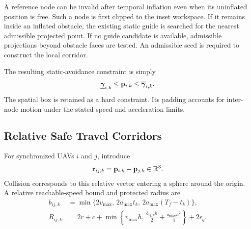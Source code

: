 A reference node can be invalid after temporal inflation even when its uninflated position is free. Such a node is first clipped to the inset workspace. If it remains inside an inflated obstacle, the existing static guide is searched for the nearest admissible projected point. If no guide candidate is available, admissible projections beyond obstacle faces are tested. An admissible seed is required to construct the local corridor.

The resulting static-avoidance constraint is simply
\begin{equation}
 \underline{\boldsymbol\gamma}_{i,k}\leq\mathbf{p}_{i,k}\leq\overline{\boldsymbol\gamma}_{i,k}.
 \label{eq:withinSTC}
\end{equation}
The spatial box is retained as a hard constraint. Its padding accounts for inter-node motion under the stated speed and acceleration limits.

\subsection{Relative Safe Travel Corridors}
For synchronized UAVs $i$ and $j$, introduce
\begin{equation}
 \mathbf r_{ij,k}=\mathbf{p}_{i,k}-\mathbf{p}_{j,k}\in\mathbb{R}^3.
 \label{eq:relative}
\end{equation}
Collision corresponds to this relative vector entering a sphere around the origin. A relative reachable-speed bound and protected radius are
\begin{subequations}\label{eq:relativepadding}\begin{align}
 b_{ij,k}&=\min\{2v_{\max},\,2a_{\max}t_k,\,2a_{\max}(T_f-t_k)\},\\
 R_{ij,k}&=2r+c+\min\left\{v_{\max}h,\,
 \frac{b_{ij,k}h}{2}+\frac{a_{\max}h^2}{4}\right\}+2\epsilon_g.
\end{align}\end{subequations}
